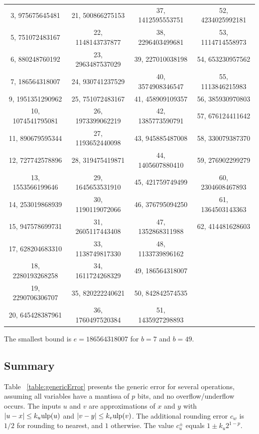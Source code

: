 \documentclass[12pt]{amsart}
\def\ulp{{\rm ulp}}
\begin{document}
\begin{center}
\begin{tabular}{cccc}
3,  975675645481  & 21, 500866275153  & 37, 1412595553751 & 52, 4234025992181\\
5,  751072483167  & 22, 1148143737877 & 38, 2296403499681 & 53, 1114714558973\\
6,  880248760192  & 23, 2963487537029 & 39, 227010038198  & 54, 653230957562 \\
7,  186564318007  & 24, 930741237529  & 40, 3574908346547 & 55, 1113846215983\\
9,  1951351290962 & 25, 751072483167  & 41, 458909109357  & 56, 385930970803 \\
10, 1074541795081 & 26, 1973399062219 & 42, 1385773590791 & 57, 676124411642 \\
11, 890679595344  & 27, 1193652440098 & 43, 945885487008  & 58, 330079387370 \\
12, 727742578896  & 28, 319475419871  & 44, 1405607880410 & 59, 276902299279 \\
13, 1553566199646 & 29, 1645653531910 & 45, 421759749499  & 60, 2304608467893\\
14, 253019868939  & 30, 1190119072066 & 46, 376795094250  & 61, 1364503143363\\
15, 947578699731  & 31, 2605117443408 & 47, 1352868311988 & 62, 414481628603 \\
17, 628204683310  & 33, 1138749817330 & 48, 1133739896162 \\
18, 2280193268258 & 34, 1611724268329 & 49, 186564318007  \\
19, 2290706306707 & 35, 820222240621  & 50, 842842574535  \\
20, 645428387961  & 36, 1760497520384 & 51, 1435927298893 \\
\end{tabular}
\end{center}
The smallest bound is $e=186564318007$ for $b=7$ and $b=49$.

\subsection{Summary}

Table ~\ref{table:genericError} presents the generic error for several operations, assuming all variables have a
mantissa of $p$ bits, and no overflow/underflow occurs.
The inputs $u$ and $v$ are
approximations of $x$ and $y$ with $|u-x| \le k_u \ulp(u)$ and
$|v-y| \le k_v \ulp(v)$. The additional rounding error $c_w$ is $1/2$ for
rounding to nearest, and $1$ otherwise.
The value $c^{\pm}_u$ equals $1 \pm k_u 2^{1-p}$.
\end{document}

